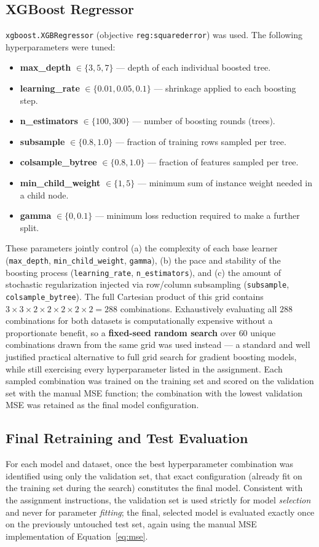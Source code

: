 \documentclass[11pt]{article}
\begin{document}
\subsection{XGBoost Regressor}
\texttt{xgboost.XGBRegressor} (objective \texttt{reg:squarederror}) was used. The following hyperparameters were tuned:
\begin{itemize}
  \item \textbf{max\_depth} $\in \{3, 5, 7\}$ --- depth of each individual boosted tree.
  \item \textbf{learning\_rate} $\in \{0.01, 0.05, 0.1\}$ --- shrinkage applied to each boosting step.
  \item \textbf{n\_estimators} $\in \{100, 300\}$ --- number of boosting rounds (trees).
  \item \textbf{subsample} $\in \{0.8, 1.0\}$ --- fraction of training rows sampled per tree.
  \item \textbf{colsample\_bytree} $\in \{0.8, 1.0\}$ --- fraction of features sampled per tree.
  \item \textbf{min\_child\_weight} $\in \{1, 5\}$ --- minimum sum of instance weight needed in a child node.
  \item \textbf{gamma} $\in \{0, 0.1\}$ --- minimum loss reduction required to make a further split.
\end{itemize}
These parameters jointly control (a) the complexity of each base learner (\texttt{max\_depth}, \texttt{min\_child\_weight}, \texttt{gamma}), (b) the pace and stability of the boosting process (\texttt{learning\_rate}, \texttt{n\_estimators}), and (c) the amount of stochastic regularization injected via row/column subsampling (\texttt{subsample}, \texttt{colsample\_bytree}). The full Cartesian product of this grid contains $3\times3\times2\times2\times2\times2\times2=288$ combinations. Exhaustively evaluating all $288$ combinations for both datasets is computationally expensive without a proportionate benefit, so a \textbf{fixed-seed random search} over $60$ unique combinations drawn from the same grid was used instead --- a standard and well justified practical alternative to full grid search for gradient boosting models, while still exercising every hyperparameter listed in the assignment. Each sampled combination was trained on the training set and scored on the validation set with the manual MSE function; the combination with the lowest validation MSE was retained as the final model configuration.

\subsection{Final Retraining and Test Evaluation}
For each model and dataset, once the best hyperparameter combination was identified using only the validation set, that exact configuration (already fit on the training set during the search) constitutes the final model. Consistent with the assignment instructions, the validation set is used strictly for model \emph{selection} and never for parameter \emph{fitting}; the final, selected model is evaluated exactly once on the previously untouched test set, again using the manual MSE implementation of Equation~\ref{eq:mse}.
\end{document}
